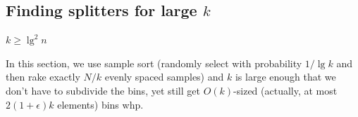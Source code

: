 \subsection*{Finding splitters for large $k$}

$k \geq \lg ^2 n$

In this section, we use sample sort (randomly select with probability $1/\lg k$ and
then rake exactly $N/k$ evenly spaced samples) and $k$ is large enough that we don't have
to subdivide the bins, yet still get $O(k)$-sized (actually, at most 
$2(1+\epsilon)k$ elements) bins whp.  



